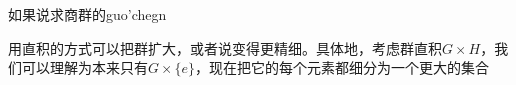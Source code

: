 


如果说求商群的guo'chegn

用直积的方式可以把群扩大，或者说变得更精细。具体地，考虑群直积$G\times H$，我们可以理解为本来只有$G\times\{e\}$，现在把它的每个元素都细分为一个更大的集合




































